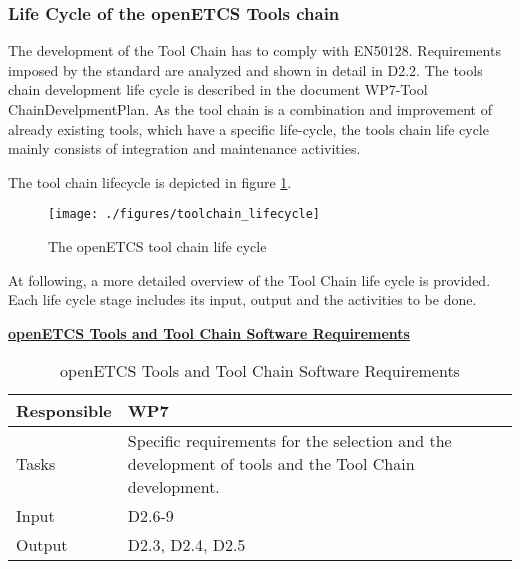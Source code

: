 \documentclass{template/openetcs_article}
\begin{document}
\subsubsection{Life Cycle of the openETCS Tools chain}
The development of the Tool Chain has to comply with EN50128. Requirements imposed by the standard are analyzed and shown in detail in D2.2. The tools chain development life cycle is described in the document WP7-Tool ChainDevelpmentPlan. As the tool chain is a combination and improvement of already existing tools, which have a specific life-cycle, the tools chain life cycle mainly consists of integration and maintenance activities. 

The tool chain lifecycle is depicted in figure  \ref{fig:TC_lifecycle}.

\begin{figure}[H]
\centering
  \texttt{[image: ./figures/toolchain\_lifecycle]}
  \caption{The openETCS tool chain life cycle}
  \label{fig:TC_lifecycle}
\end{figure}

At following, a more detailed overview of the Tool Chain life cycle is provided. Each life cycle stage includes its input, output and the activities to be done.

\newpage\underline{\textbf{openETCS Tools and Tool Chain Software Requirements}}

\begin{table}[H]
	\begin{center}
		\tablehead{\\}
		\begin{supertabular}[H]{|p{6cm}|p{8cm}|}
			\hline
			
			Responsible &
			WP7 \\
			\hline
			
			Tasks &
			
			Specific requirements for the selection and the development of tools and the Tool Chain development.\\
			\hline
						
			Input &
			 D2.6-9\\
			\hline
			
			Output &
			
			 D2.3, D2.4, D2.5\\
			\hline
	
		\end{supertabular}
	\end{center}
	\caption{openETCS Tools and Tool Chain Software Requirements}
\end{table}
\end{document}
